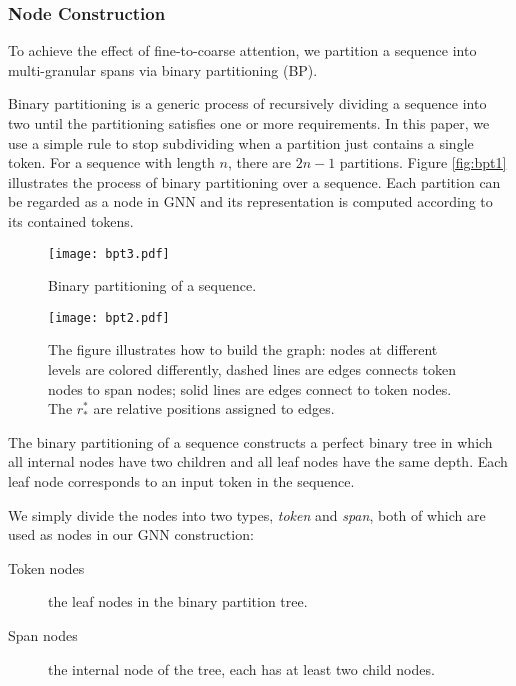 \documentclass[11pt,a4paper]{article}
\begin{document}
\subsubsection{Node Construction}

To achieve the effect of fine-to-coarse attention, we partition a sequence into multi-granular spans via binary partitioning (BP).

Binary partitioning is a generic process of recursively dividing a sequence into two until the partitioning satisfies one or more requirements. In this paper, we use a simple rule to stop subdividing when a partition just contains a single token.
For a sequence with length $n$, there are $2n-1$ partitions. Figure \ref{fig:bpt1} illustrates the process of binary partitioning over a sequence.  Each partition can be regarded as a node in GNN and its representation is computed according to its contained tokens.



\begin{figure}[!htb]
\centering
\texttt{[image: bpt3.pdf]}
\caption{Binary partitioning of a sequence.}
\label{fig:bpt3}
\end{figure}



 \begin{figure*}[!htb]
\centering
\texttt{[image: bpt2.pdf]}
\caption{The figure illustrates how to build the graph: nodes at different levels are colored differently, dashed lines are edges connects token nodes to span nodes; solid lines are edges connect to token nodes. The $r_{*}^{*}$ are relative positions assigned to edges.}
\label{fig:tree}
\end{figure*}

The binary partitioning of a sequence constructs a perfect binary tree in which all internal nodes have two children and all leaf nodes have the same depth. Each leaf node corresponds to an input token in the sequence.

We simply divide the nodes into two types, \emph{token} and \emph{span}, both of which are used as nodes in our GNN construction:
\begin{description}
    \item [Token nodes] the leaf nodes in the binary partition tree.
    \item [Span nodes] the internal node of the tree, each has at least two child nodes.
\end{description}
\end{document}

